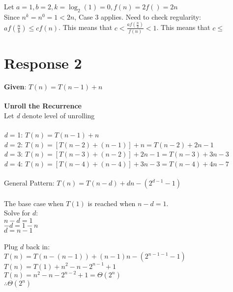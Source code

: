 \documentclass[12pt, a4paper]{article}
\begin{document}
    Let \(a = 1, b = 2, k = \log_{2}(1) = 0, f(n) = 2f() = 2n\)\\
    Since \(n^{k} = n^{0} = 1 < 2n\), Case 3 applies. Need to check regularity: \(af(\frac{n}{b}) \leq cf(n)\). This means that \(c < \frac{af(\frac{n}{b})}{f(n)} < 1\).
    This means that \(c \leq \)

    \newpage
    
\section*{\centering Response 2}
    \textbf{Given}: \(T(n) = T(n-1) + n\)\\
    \\
    \textbf{Unroll the Recurrence}\\
    Let \textit{d} denote level of unrolling\\
    \\
    \textit{d} = 1: \(T(n) = T(n-1) + n\)\\
    \textit{d} = 2: \(T(n) = [T(n-2) + (n-1)] + n = T(n-2) + 2n - 1\)\\
    \textit{d} = 3: \(T(n) = [T(n-3) + (n-2)] + 2n - 1 = T(n-3) + 3n - 3\)\\
    \textit{d} = 4: \(T(n) = [T(n-4) + (n-4)] + 3n - 3 = T(n-4) + 4n - 7\)\\
    \\
    General Pattern: \(T(n) = T(n-d) + dn - (2^{d-1} - 1)\)\\
    \\
    The base case when \(T(1)\) is reached when \(n-d = 1\).\\
    Solve for \(d\): \\
    \(n - d = 1\)\\
    \(-d = 1-n\)\\
    \(d=n-1\) \\
    \\
    Plug \(d\) back in:\\
    \(T(n)=T(n-(n-1))+(n-1)n-(2^{n-1-1}-1)\)\\
    \(T(n)=T(1)+n^2-n-2^{n-1}+1\)\\
    \(T(n)=n^2-n-2^{n-2}+1 = \Theta{(2^n)}\)\\
    \(\therefore \Theta{(2^n)}\)
    \newpage
\end{document}
